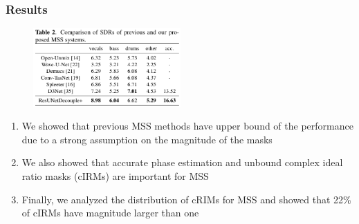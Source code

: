 \documentclass[usenames,dvipsnames]{beamer}
\begin{document}
\begin{frame}
	\frametitle{Results}
	\begin{figure}
	\centering
	\includegraphics[height=3cm]{./ismir2021-phasepaper.png}
	\end{figure}

	\begin{enumerate}
		\item
			We showed that previous MSS methods have upper bound of the performance due to a strong assumption on the magnitude of the masks
		\item
			We also showed that accurate phase estimation and unbound complex ideal ratio masks (cIRMs) are important for MSS
		\item
			Finally, we analyzed the distribution of cRIMs for MSS and showed that 22\% of cIRMs have magnitude larger than one
	\end{enumerate}
\end{frame}
\end{document}
